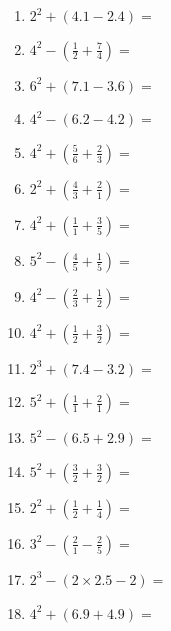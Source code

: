 \documentclass[12pt]{article}
\begin{document}
\begin{enumerate}
\newpage
\item \large $ 2^{2} + (4.1 - 2.4) = $ \vspace{1.4cm}
\item \large $ 4^{2} - (\frac{1}{2} + \frac{7}{4}) = $ \vspace{1.4cm}
\item \large $ 6^{2} + (7.1 - 3.6) = $ \vspace{1.4cm}
\item \large $ 4^{2} - (6.2 - 4.2) = $ \vspace{1.4cm}
\item \large $ 4^{2} + (\frac{5}{6} + \frac{2}{3}) = $ \vspace{1.4cm}
\item \large $ 2^{2} + (\frac{4}{3} + \frac{2}{1}) = $ \vspace{1.4cm}
\item \large $ 4^{2} + (\frac{1}{1} + \frac{3}{5}) = $ \vspace{1.4cm}
\item \large $ 5^{2} - (\frac{4}{5} + \frac{1}{5}) = $ \vspace{1.4cm}
\item \large $ 4^{2} - (\frac{2}{3} + \frac{1}{2}) = $ \vspace{1.4cm}
\item \large $ 4^{2} + (\frac{1}{2} + \frac{3}{2}) = $ \vspace{1.4cm}
\newpage
\item \large $ 2^{3} + (7.4 - 3.2) = $ \vspace{1.4cm}
\item \large $ 5^{2} + (\frac{1}{1} + \frac{2}{1}) = $ \vspace{1.4cm}
\item \large $ 5^{2} - (6.5 + 2.9) = $ \vspace{1.4cm}
\item \large $ 5^{2} + (\frac{3}{2} + \frac{3}{2}) = $ \vspace{1.4cm}
\item \large $ 2^{2} + (\frac{1}{2} + \frac{1}{4}) = $ \vspace{1.4cm}
\item \large $ 3^{2} - (\frac{2}{1} - \frac{2}{5}) = $ \vspace{1.4cm}
\item \large $ 2^{3} - (2 \times 2.5 - 2) = $ \vspace{1.4cm}
\item \large $ 4^{2} + (6.9 + 4.9) = $ \vspace{1.4cm}

\end{enumerate}
\end{document}
